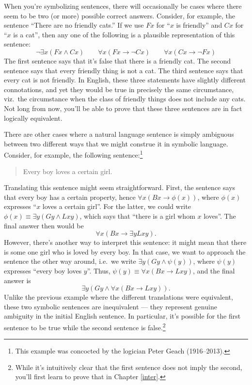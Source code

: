 When you're symbolizing sentences, there will occasionally be cases
where there seem to be two (or more) possible correct answers.
Consider, for example, the sentence ``There are no friendly cats.''
If we use $Fx$ for ``$x$ is friendly'' and $Cx$ for ``$x$ is a cat'',
then any one of the following is a plausible representation of this
sentence:
\[ \neg\exists x(Fx\wedge Cx) \qquad \forall x(Fx\to \neg Cx) \qquad
  \forall x(Cx\to\neg Fx) \] The first sentence says that it's false
that there is a friendly cat.  The second sentence says that every
friendly thing is not a cat.  The third sentence says that every cat
is not friendly.  In English, these three statements have slightly
different connotations, and yet they would be true in precisely the
same circumstance, viz.\ the circumstance when the class of friendly
things does not include any cats.  Not long from now, you'll be able
to prove that these three sentences are in fact logically equivalent.

There are other cases where a natural language sentence is simply
ambiguous between two different ways that we might construe it in
symbolic language.  Consider, for example, the following
sentence:\footnote{This example was concocted by the logician Peter
  Geach (1916--2013).}
\begin{quote} Every boy loves a certain girl. \end{quote} Translating
this sentence might seem straightforward.  First, the sentence says
that every boy has a certain property, hence
$\forall x(Bx\to \phi (x))$, where $\phi (x)$ expresses ``$x$ loves a
certain girl''.  For the latter, we could write
$\phi (x)\equiv\exists y (Gy\wedge Lxy)$, which says that ``there is a
girl whom $x$ loves''.  The final answer then would be
\[ \forall x(Bx\to \exists yLxy ) .\] However, there's another way to
interpret this sentence: it might mean that there is some one girl who
is loved by every boy.  In that case, we want to approach the sentence
the other way around, i.e.\ we write $\exists y(Gy\wedge \psi (y))$,
where $\psi (y)$ expresses ``every boy loves $y$''.  Thus,
$\psi (y)\equiv \forall x(Bx\to Lxy)$, and the final answer is
\[ \exists y(Gy\wedge \forall x(Bx\to Lxy)) .\] Unlike the previous
example where the different translations were equivalent, these two
symbolic sentences are inequivalent --- they represent genuine
ambiguity in the initial English sentence.  In particular, it's
possible for the first sentence to be true while the second sentence
is false.\footnote{While it's intuitively clear that the first
  sentence does not imply the second, you'll first learn to prove that
  in Chapter \ref{inter}.}

